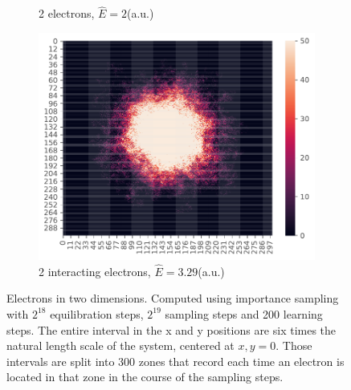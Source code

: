 \documentclass[11pt,a4paper,titlepage]{article}
\begin{document}
\begin{figure}[H]
\begin{subfigure}[t]{.5\textwidth}
\caption{2 electrons, $\hat E = 2$(a.u.)}
\label{J2}
\end{subfigure}
\begin{subfigure}[b]{.5\textwidth}
\centering
\includegraphics[trim=0cm 0.0cm 0cm 0.0cm,scale = 0.6]{D2_P_2I_Y_Metropolis_S_2pow19_eqS_2pow18_Position_sampling_P_2_NH_2_I_1.pdf}
\caption{2 interacting electrons, $\hat E = 3.29$(a.u.)}
\label{J1}
\end{subfigure}
\caption[as]{Electrons in two dimensions. Computed using importance sampling with $2^{18}$ equilibration steps, $2^{19}$ sampling steps and 200 learning steps. The entire interval in the x and y positions are six times the natural length scale of the system, centered at $x,y =0$. Those intervals are split into 300 zones that record each time an electron is located in that zone in the course of the sampling steps. }
\label{fig:Metropolis_pos_sampling}
\end{figure}
\end{document}

